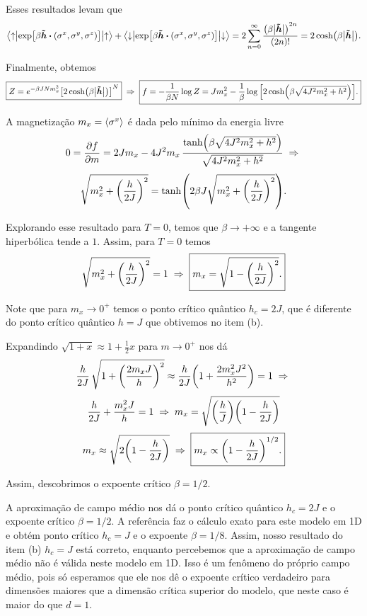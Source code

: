 \documentclass[a4paper,10pt]{article}
\newcommand{\hhh}{\bm{\tilde{h}}}
\begin{document}
Esses resultados levam que
$$
\ev**{\exp[\beta \hhh \vdot (\s^x, \s^y, \s^z)]}{\up} +
\ev**{\exp[\beta \hhh \vdot (\s^x, \s^y, \s^z)]}{\down} =
2 \sum_{n=0}^{\infty} \frac{\qty(\beta \abs{\hhh})^{2n}}{(2n)!} = 2 \cosh(\beta\abs{\hhh}).
$$

Finalmente, obtemos
$$
\boxed{ Z = e^{-\beta J N m_x^2} \qty[2\cosh(\beta \abs{\hhh})]^N } \implies
\boxed{ f = -\frac{1}{\beta N} \log Z =
J m_x^2 - \frac{1}{\beta} \log\qty[2\cosh(\beta\sqrt{4J^2 m_x^2 + h^2})]. }
$$

\n

A magnetização $m_x = \ev{\s^x}$ é dada pelo mínimo da energia livre
$$
0 = \pdv{f}{m} =
2 J m_x - 4 J^2m_x \, \frac{\tanh(\beta\sqrt{4J^2 m_x^2 + h^2})}{\sqrt{4J^2 m_x^2 + h^2}} \; \Rightarrow \;
$$
$$
\sqrt{m_x^2 + \qty(\frac{h}{2J})^2} = \tanh(2 \beta J \sqrt{m_x^2 + \qty(\frac{h}{2J})^2}).
$$

Explorando esse resultado para $T = 0$, temos que $\beta \to +\infty$ e a tangente hiperbólica tende a $1$. Assim, para $T = 0$ temos
$$
\sqrt{m_x^2 + \qty(\frac{h}{2J})^2} = 1 \; \Rightarrow \; \boxed{ m_x = \sqrt{1 - \qty(\frac{h}{2J})^2}. }
$$

Note que para $m_x \to 0^+$ temos o ponto crítico quântico $h_c = 2J$, que é diferente do ponto crítico quântico $h = J$ que obtivemos no item (b).

\n

Expandindo $\sqrt{1+x} \approx 1 + \frac{1}{2}x$ para $m \to 0^+$ nos dá
$$
\frac{h}{2J} \, \sqrt{1 + \qty(\frac{2 m_x J}{h})^2} \approx
\frac{h}{2J} \qty(1 + \frac{2 m_x^2 J^2}{h^2}) = 1
\; \Rightarrow \;
$$
$$
\frac{h}{2J}  + \frac{m_x^2 J}{h} = 1 \; \Rightarrow \;
m_x = \sqrt{\qty(\frac{h}{J})\qty(1-\frac{h}{2J})}
$$
$$
m_x \approx \sqrt{2\qty(1-\frac{h}{2J})} \; \Rightarrow \; \boxed{ m_x \propto \qty(1-\frac{h}{2J})^{1/2}. }
$$

Assim, descobrimos o expoente crítico $\beta = 1/2$.

\n

A aproximação de campo médio nos dá o ponto crítico quântico $h_c = 2J$ e o expoente crítico $\beta = 1/2$. A referência \cite{pfeuty} faz o cálculo exato para este modelo em 1D e obtém  ponto crítico $h_c = J$ e o expoente $\beta = 1/8$. Assim, nosso resultado do item (b) $h_c = J$ está correto, enquanto percebemos que a aproximação de campo médio não é válida neste modelo em 1D. Isso é um fenômeno do próprio campo médio, pois só esperamos que ele nos dê o expoente crítico verdadeiro para dimensões maiores que a dimensão crítica superior do modelo, que neste caso é maior do que $d=1$.
\end{document}

